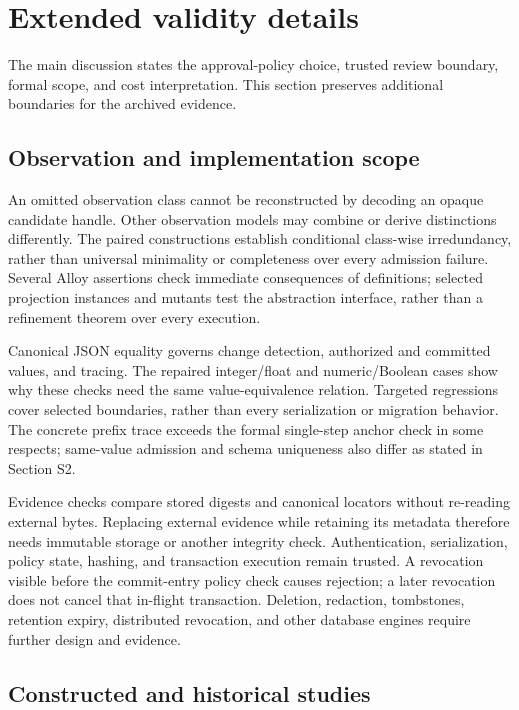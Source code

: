 \documentclass[11pt,a4paper]{article}
\begin{document}
\section{Extended validity details}
\label{app:extended-validity}

The main discussion states the approval-policy choice, trusted review boundary, formal scope, and cost interpretation. This section preserves additional boundaries for the archived evidence.

\subsection{Observation and implementation scope}

An omitted observation class cannot be reconstructed by decoding an opaque candidate handle. Other observation models may combine or derive distinctions differently. The paired constructions establish conditional class-wise irredundancy, rather than universal minimality or completeness over every admission failure. Several Alloy assertions check immediate consequences of definitions; selected projection instances and mutants test the abstraction interface, rather than a refinement theorem over every execution.

Canonical JSON equality governs change detection, authorized and committed values, and tracing. The repaired integer/float and numeric/Boolean cases show why these checks need the same value-equivalence relation. Targeted regressions cover selected boundaries, rather than every serialization or migration behavior. The concrete prefix trace exceeds the formal single-step anchor check in some respects; same-value admission and schema uniqueness also differ as stated in Section S2.

Evidence checks compare stored digests and canonical locators without re-reading external bytes. Replacing external evidence while retaining its metadata therefore needs immutable storage or another integrity check. Authentication, serialization, policy state, hashing, and transaction execution remain trusted. A revocation visible before the commit-entry policy check causes rejection; a later revocation does not cancel that in-flight transaction. Deletion, redaction, tombstones, retention expiry, distributed revocation, and other database engines require further design and evidence.

\subsection{Constructed and historical studies}
\end{document}
